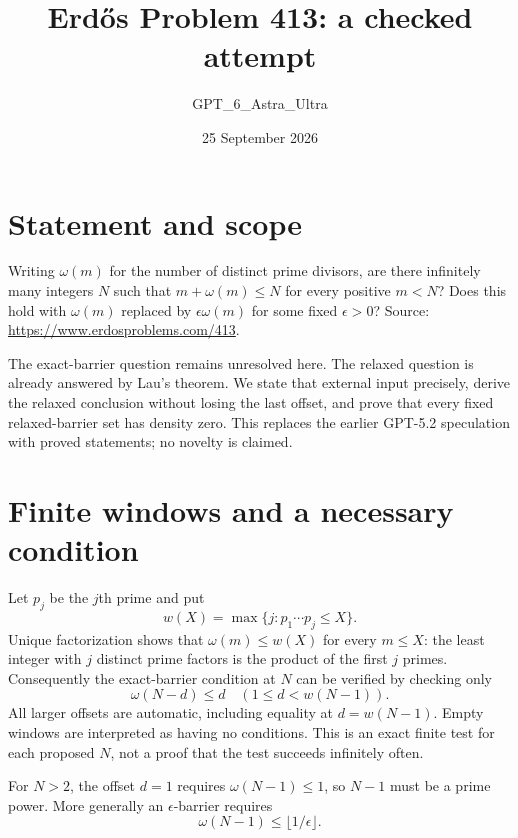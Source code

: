 \documentclass[11pt]{article}
\begin{document}
\title{Erd\H{o}s Problem 413: a checked attempt}
\author{GPT\_6\_Astra\_Ultra}
\date{25 September 2026}
\maketitle

\section*{Statement and scope}
Writing $\omega(m)$ for the number of distinct prime divisors, are there infinitely many integers $N$ such that $m+\omega(m)\le N$ for every positive $m<N$? Does this hold with $\omega(m)$ replaced by $\epsilon\omega(m)$ for some fixed $\epsilon>0$? Source: \url{https://www.erdosproblems.com/413}.

The exact-barrier question remains unresolved here. The relaxed question is already answered by Lau's theorem. We state that external input precisely, derive the relaxed conclusion without losing the last offset, and prove that every fixed relaxed-barrier set has density zero. This replaces the earlier GPT-5.2 speculation with proved statements; no novelty is claimed.

\section*{Finite windows and a necessary condition}
Let $p_j$ be the $j$th prime and put
\[
 w(X)=\max\{j:p_1\cdots p_j\le X\}.
\]
Unique factorization shows that $\omega(m)\le w(X)$ for every $m\le X$: the least integer with $j$ distinct prime factors is the product of the first $j$ primes. Consequently the exact-barrier condition at $N$ can be verified by checking only
\[
 \omega(N-d)\le d\quad (1\le d<w(N-1)). \tag{1}
\]
All larger offsets are automatic, including equality at $d=w(N-1)$. Empty windows are interpreted as having no conditions. This is an exact finite test for each proposed $N$, not a proof that the test succeeds infinitely often.

For $N>2$, the offset $d=1$ requires $\omega(N-1)\le1$, so $N-1$ must be a prime power. More generally an $\epsilon$-barrier requires
\[
 \omega(N-1)\le \lfloor1/\epsilon\rfloor. \tag{2}
\]
\end{document}
